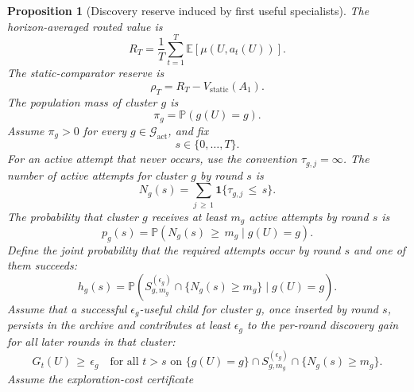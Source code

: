 \documentclass{article} %
\newtheorem{proposition}[theorem]{Proposition}
\begin{document}
\begin{proposition}[Discovery reserve induced by first useful specialists]
\label{prop:4}
The horizon-averaged routed value is
\begin{equation}
\label{eq:app-third-reserve-rt}
R_T
=
\frac{1}{T}
\sum_{t=1}^{T}
\mathbb{E}[\mu(U,a_t(U))].
\end{equation}
The static-comparator reserve is
\begin{equation}
\label{eq:app-third-reserve-rho}
\rho_T
=
R_T
-
V_{\mathrm{static}}(A_1).
\end{equation}
The population mass of cluster \(g\) is
\begin{equation}
\label{eq:app-third-reserve-pi}
\pi_g
=
\mathbb{P}(g(U)=g).
\end{equation}
Assume \(\pi_g>0\) for every \(g\in\mathcal G_{\mathrm{act}}\), and fix
\begin{equation}
\label{eq:app-third-reserve-s}
s\in\{0,\ldots,T\}.
\end{equation}
For an active attempt that never occurs, use the convention
\(\tau_{g,j}=\infty\).
The number of active attempts for cluster \(g\) by round \(s\) is
\begin{equation}
\label{eq:app-third-reserve-ng}
N_g(s)
=
\sum_{j\,\ge\, 1}
\mathbf{1}\{\tau_{g,j}\,\le\, s\}.
\end{equation}
The probability that cluster \(g\) receives at least \(m_g\) active attempts by round \(s\) is
\begin{equation}
\label{eq:app-third-reserve-pg}
p_g(s)
=
\mathbb{P}\!\left(
N_g(s)\,\ge\, m_g
\mid
g(U)=g
\right).
\end{equation}
Define the joint probability that the required attempts occur by round $s$ and
one of them succeeds:
\begin{equation}
\label{eq:app-third-reserve-hg}
h_g(s)
=
\mathbb P\!\left(
S_{g,m_g}^{(\epsilon_g)}
\cap\{N_g(s)\ge m_g\}
\mid g(U)=g
\right).
\end{equation}
Assume that a successful \(\epsilon_g\)-useful child for cluster \(g\), once inserted by round \(s\), persists in the archive and contributes at least \(\epsilon_g\) to the per-round discovery gain for all later rounds in that cluster:
\begin{equation}
\label{eq:app-third-reserve-persistence}
G_t(U)
\,\ge\,
\epsilon_g
\quad
\text{for all }t>s
\text{ on }
\{g(U)=g\}\cap S_{g,m_g}^{(\epsilon_g)}
\cap\{N_g(s)\ge m_g\}.
\end{equation}
Assume the exploration-cost certificate
\begin{equation}

\end{equation}
\end{proposition}
\end{document}
